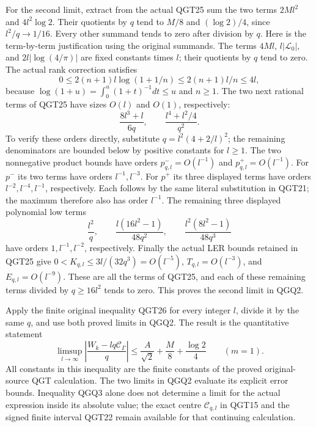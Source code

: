 \documentclass[11pt,a4paper]{article}
\begin{document}
For the second limit, extract from the actual QGT25 sum the two
terms $2Ml^2$ and $4l^2\log2$. Their quotients by $q$ tend to
$M/8$ and $(\log2)/4$, since $l^2/q\to1/16$.
Every other summand tends to zero after division by $q$.
Here is the term-by-term justification using the original summands.
The terms $4Ml$, $l|\mathcal L_0|$, and
$2l|\log(4/\pi)|$ are fixed constants times $l$; their quotients
by $q$ tend to zero. The actual rank correction satisfies
\[
 0\le2(n+1)l\log(1+1/n)
       \le2(n+1)l/n\le4l,
\]
because $\log(1+u)=\int_0^u(1+t)^{-1}dt\le u$ and $n\ge1$.
The two next rational terms of QGT25 have sizes $O(l)$ and $O(1)$,
respectively:
\[
 \frac{8l^3+l}{6q},\qquad\frac{l^4+l^2/4}{q^2}.
\]
To verify these orders directly, substitute
$q=l^2(4+2/l)^2$; the remaining denominators are bounded below
by positive constants for $l\ge1$.
The two nonnegative product bounds have orders
$p^-_{q,l}=O(l^{-1})$ and $p^+_{q,l}=O(l^{-1})$.
For $p^-$ its two terms have orders $l^{-1},l^{-3}$.
For $p^+$ its three displayed terms have orders
$l^{-2},l^{-4},l^{-1}$, respectively. Each follows by the same
literal substitution in QGT21; the maximum therefore also has order
$l^{-1}$.
The remaining three displayed polynomial low terms
\[
 \frac{l^2}{q},\qquad
 \frac{l(16l^2-1)}{48q^2},\qquad
 \frac{l^2(8l^2-1)}{48q^3}
\]
have orders $1,l^{-1},l^{-2}$, respectively.
Finally the actual LER bounds retained in QGT25 give
$0<K_{q,l}\le3l/(32q^3)=O(l^{-5})$,
$T_{q,l}=O(l^{-3})$, and $E_{q,l}=O(l^{-9})$.
These are all the terms of QGT25, and each of these remaining terms
divided by $q\ge16l^2$ tends to zero. This proves the second
limit in QGQ2.

Apply the finite original inequality QGT26 for every integer $l$,
divide it by the same $q$, and use both proved limits in QGQ2.
The result is the quantitative statement
\[
 \boxed{\displaystyle
 \limsup_{l\to\infty}
 \left|\frac{W_k-lq\mathcal C_\Gamma}{q}\right|
 \le\frac A{\sqrt2}+\frac M8+\frac{\log2}{4}
 \qquad(m=1).}
 \tag{QGQ3}
\]
All constants in this inequality are the finite constants of the
proved original-source QGT calculation. The two limits in QGQ2
evaluate its explicit error bounds. Inequality QGQ3 alone does not
determine a limit for the actual expression inside its absolute value;
the exact centre $\mathcal C_{q,l}$ in QGT15 and the signed finite
interval QGT22 remain available for that continuing calculation.
\end{document}

